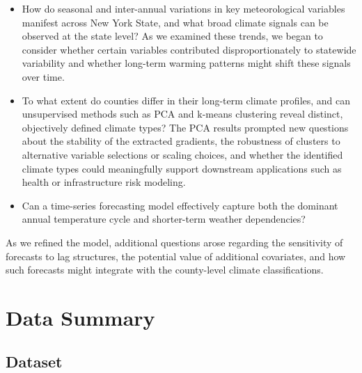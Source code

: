 \documentclass[
]{article}
\begin{document}
\begin{itemize}
\item
  How do seasonal and inter-annual variations in key meteorological
  variables manifest across New York State, and what broad climate
  signals can be observed at the state level? As we examined these
  trends, we began to consider whether certain variables contributed
  disproportionately to statewide variability and whether long-term
  warming patterns might shift these signals over time.
\item
  To what extent do counties differ in their long-term climate profiles,
  and can unsupervised methods such as PCA and k-means clustering reveal
  distinct, objectively defined climate types? The PCA results prompted
  new questions about the stability of the extracted gradients, the
  robustness of clusters to alternative variable selections or scaling
  choices, and whether the identified climate types could meaningfully
  support downstream applications such as health or infrastructure risk
  modeling.
\item
  Can a time-series forecasting model effectively capture both the
  dominant annual temperature cycle and shorter-term weather
  dependencies?
\end{itemize}

As we refined the model, additional questions arose regarding the
sensitivity of forecasts to lag structures, the potential value of
additional covariates, and how such forecasts might integrate with the
county-level climate classifications.

\section{\texorpdfstring{\textbf{Data
Summary}}{Data Summary}}\label{data-summary}

\subsection{Dataset}\label{dataset}
\end{document}

